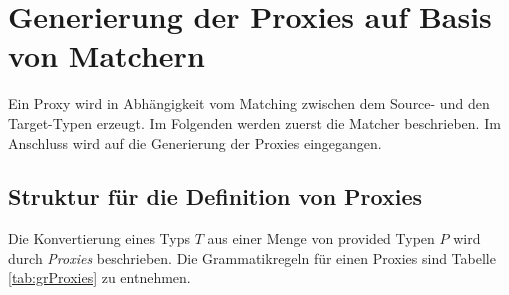 \section{Generierung der Proxies auf Basis von Matchern}
Ein Proxy wird in Abhängigkeit vom Matching zwischen dem Source- und den Target-Typen erzeugt. Im Folgenden werden zuerst die Matcher beschrieben. Im Anschluss wird auf die Generierung der Proxies eingegangen.
\subsection{Struktur für die Definition von Proxies}\label{sec:proxygram}
Die Konvertierung eines Typs $T$ aus einer Menge von provided Typen $P$ wird durch \emph{Proxies} beschrieben. Die Grammatikregeln für einen Proxies sind Tabelle \ref{tab:grProxies} zu entnehmen.
